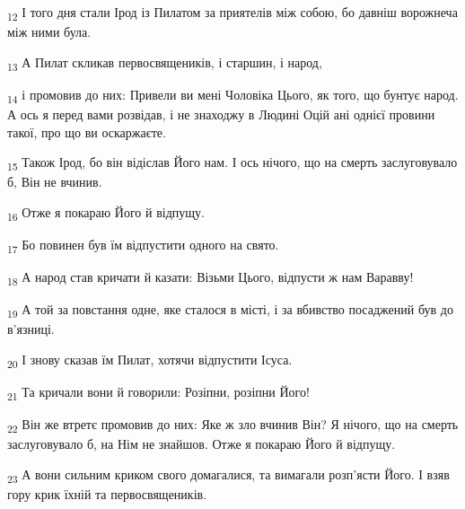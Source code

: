 \begin{tcolorbox}
\textsubscript{12} І того дня стали Ірод із Пилатом за приятелів між собою, бо давніш ворожнеча між ними була.
\end{tcolorbox}
\begin{tcolorbox}
\textsubscript{13} А Пилат скликав первосвящеників, і старшин, і народ,
\end{tcolorbox}
\begin{tcolorbox}
\textsubscript{14} і промовив до них: Привели ви мені Чоловіка Цього, як того, що бунтує народ. А ось я перед вами розвідав, і не знаходжу в Людині Оцій ані однієї провини такої, про що ви оскаржаєте.
\end{tcolorbox}
\begin{tcolorbox}
\textsubscript{15} Також Ірод, бо він відіслав Його нам. І ось нічого, що на смерть заслуговувало б, Він не вчинив.
\end{tcolorbox}
\begin{tcolorbox}
\textsubscript{16} Отже я покараю Його й відпущу.
\end{tcolorbox}
\begin{tcolorbox}
\textsubscript{17} Бо повинен був їм відпустити одного на свято.
\end{tcolorbox}
\begin{tcolorbox}
\textsubscript{18} А народ став кричати й казати: Візьми Цього, відпусти ж нам Варавву!
\end{tcolorbox}
\begin{tcolorbox}
\textsubscript{19} А той за повстання одне, яке сталося в місті, і за вбивство посаджений був до в'язниці.
\end{tcolorbox}
\begin{tcolorbox}
\textsubscript{20} І знову сказав їм Пилат, хотячи відпустити Ісуса.
\end{tcolorbox}
\begin{tcolorbox}
\textsubscript{21} Та кричали вони й говорили: Розіпни, розіпни Його!
\end{tcolorbox}
\begin{tcolorbox}
\textsubscript{22} Він же втретє промовив до них: Яке ж зло вчинив Він? Я нічого, що на смерть заслуговувало б, на Нім не знайшов. Отже я покараю Його й відпущу.
\end{tcolorbox}
\begin{tcolorbox}
\textsubscript{23} А вони сильним криком свого домагалися, та вимагали розп'ясти Його. І взяв гору крик їхній та первосвящеників.
\end{tcolorbox}
